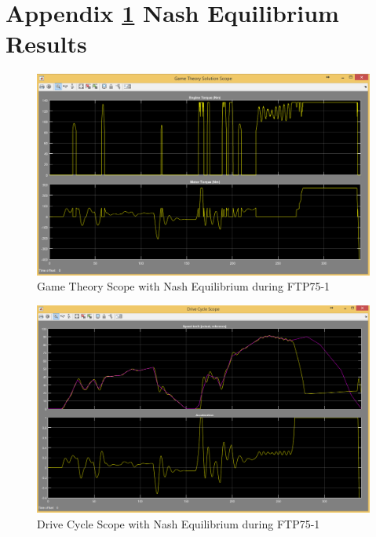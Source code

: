 \appendix
\chapter{Appendix \ref{app:1} Nash Equilibrium Results}
\label{app:1}


\begin{figure}[h]
\centering
\includegraphics[scale=0.4]{figures/NashEquilibrium/FTP75-1/gameTheory13Juni}
\caption{Game Theory Scope with Nash Equilibrium during FTP75-1}
\label{fig:gtne1}
\end{figure}

\begin{figure}[h]
\centering
\includegraphics[scale=0.4]{figures/NashEquilibrium/FTP75-1/driveCycle13Juni}
\caption{Drive Cycle Scope with Nash Equilibrium during FTP75-1}
\label{fig:dcne1}
\end{figure}

